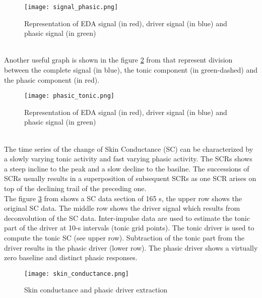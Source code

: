 \begin{figure}[h]
    \centering
    \texttt{[image: signal\_phasic.png]} 
	\caption{Representation of EDA signal (in red), driver signal (in blue) and phasic signal (in green)}
    \label{fig:signal_phasic}
\end{figure}
\\
Another useful graph is shown in the figure \ref{fig:phasic_tonic} from \cite{hernandez2014using} that represent division between the complete signal (in blue), the tonic component (in green-dashed) and the phasic component (in red).
\begin{figure}[h]
    \centering
    \texttt{[image: phasic\_tonic.png]} 
	\caption{Representation of EDA signal (in red), driver signal (in blue) and phasic signal (in green)}
    \label{fig:phasic_tonic}
\end{figure}
\\
The time series of the change of Skin Conductance (SC) can be characterized by a slowly varying tonic activity and fast varying phasic activity. The SCRs shows a steep incline to the peak and a slow decline to the basilne. The successions of SCRs usually results in a superposition of subsequent SCRs as one SCR arises on top of the declining trail of the preceding one.
\\
The figure \ref{fig:skin_conductance} from \cite{benedek2010continuous} shows a SC data section of 165 s, the upper row shows the original SC data. The middle row shows the driver signal which results from deconvolution of the SC data. Inter-impulse data are used to estimate the tonic part of the driver at 10-s intervals (tonic grid points). The tonic driver is used to compute the tonic SC (see upper row). Subtraction of the tonic part from the driver results in the phasic driver (lower row). The phasic driver shows a virtually zero baseline and distinct phasic responses. 
\begin{figure}[h]
    \centering
    \texttt{[image: skin\_conductance.png]} 
	\caption{Skin conductance and phasic driver extraction}
    \label{fig:skin_conductance}
\end{figure}

